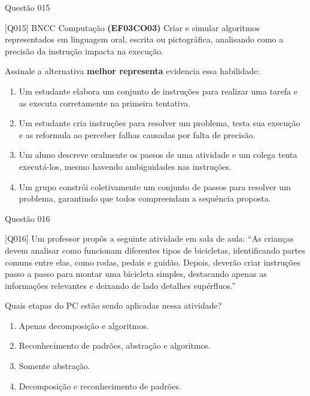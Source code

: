 \documentclass[xcolor=dvipsnames,table]{beamer}
\begin{document}
	\begin{frame}[shrink]{Questão 015}
		\begin{block}{[Q015] BNCC Computação}
		 {\bf (EF03CO03)} Criar e simular algoritmos representados em linguagem oral, escrita ou pictográfica, analisando como a precisão da instrução impacta na execução.

        Assinale a alternativa {\bf melhor representa} evidencia essa habilidade: 
		\end{block}
		\begin{enumerate}[label=(\Alph*)]
			\item Um estudante elabora um conjunto de instruções para realizar uma tarefa e as executa corretamente na primeira tentativa.
			\item Um estudante cria instruções para resolver um problema, testa sua execução e as reformula ao perceber falhas causadas por falta de precisão.
			\item Um aluno descreve oralmente os passos de uma atividade e um colega tenta executá-los, mesmo havendo ambiguidades nas instruções.
			\item Um grupo constrói coletivamente um conjunto de passos para resolver um problema, garantindo que todos compreendam a sequência proposta.
		\end{enumerate}
	\end{frame}

    \begin{frame}[shrink]{Questão 016}
		\begin{block}{[Q016]}
		 Um professor propôs a seguinte atividade em sala de aula:
“As crianças devem analisar como funcionam diferentes tipos de bicicletas, identificando partes comuns entre elas, como rodas, pedais e guidão. Depois, deverão criar instruções passo a passo para montar uma bicicleta simples, destacando apenas as informações relevantes e deixando de lado detalhes supérfluos.”

Quais etapas do PC estão sendo aplicadas nessa atividade?

		\end{block}
		\begin{enumerate}[label=(\Alph*)]
			\item Apenas decomposição e algoritmos.
			\item Reconhecimento de padrões, abstração e algoritmos.
			\item Somente abstração.
			\item Decomposição e reconhecimento de padrões. 
		\end{enumerate}
	\end{frame}
\end{document}
